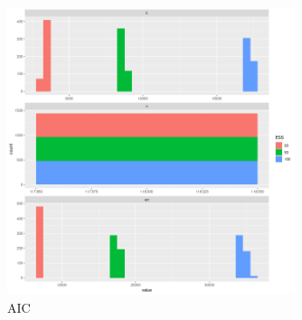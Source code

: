 \begin{figure}[ht!]\centering\includegraphics[width=0.75\textwidth]{figures/aic-1.png} \caption{AIC}\label{fig:aic} \end{figure}

